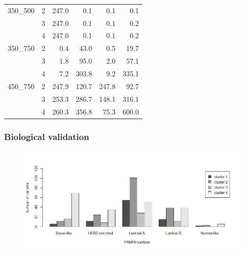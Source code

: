 \documentclass[conference]{IEEEtran}
\begin{document}
\begin{table}
\begin{tabular}{|ll|rr|rr|}
\hline
350\_500 & 2 &     247.0 &     0.1 &       0.1 &     0.1 \\
         & 3 &     247.0 &     0.1 &       0.1 &     0.2 \\
         & 4 &     247.0 &     0.1 &       0.1 &     0.2 \\
\hline
350\_750 & 2 &       0.4 &    43.0 &       0.5 &    19.7 \\
         & 3 &       1.8 &    95.0 &       2.0 &    57.1 \\
         & 4 &       7.2 &   303.8 &       9.2 &   335.1 \\
\hline
450\_750 & 2 &     247.9 &   120.7 &     247.8 &    92.7 \\
         & 3 &     253.3 &   286.7 &     148.1 &   316.1 \\
         & 4 &     260.3 &   356.8 &      75.3 &       600.0  \\
\hline
\end{tabular}
\end{table}

\subsubsection{Biological validation}

\begin{figure}
\centering
\includegraphics[scale=0.33]{images/Plot_clusters_per_subtype_4Groups.jpeg}
\captionsetup{font=small}
\label{fig:plot_clusters_subtype}
\end{figure}
\end{document}
